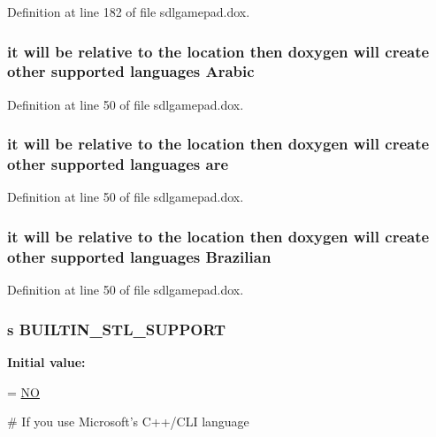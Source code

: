 Definition at line 182 of file sdlgamepad.\-dox.

\hypertarget{sdlgamepad_8dox_a09569d1a0354f8f4cabb5f3633abc16b}{
\subsubsection[{Arabic}]{\setlength{\rightskip}{0pt plus 5cm}it will be relative to the {\bf location} then doxygen will create other supported languages Arabic}}\label{sdlgamepad_8dox_a09569d1a0354f8f4cabb5f3633abc16b}


Definition at line 50 of file sdlgamepad.\-dox.

\hypertarget{sdlgamepad_8dox_a6d0965b20c4eb2235e8f9f5f0e5193ae}{
\subsubsection[{are}]{\setlength{\rightskip}{0pt plus 5cm}it will be relative to the {\bf location} then doxygen will create other supported languages are}}\label{sdlgamepad_8dox_a6d0965b20c4eb2235e8f9f5f0e5193ae}


Definition at line 50 of file sdlgamepad.\-dox.

\hypertarget{sdlgamepad_8dox_a8e7728ba488d59bc2d1023e8f1325f11}{
\subsubsection[{Brazilian}]{\setlength{\rightskip}{0pt plus 5cm}it will be relative to the {\bf location} then doxygen will create other supported languages Brazilian}}\label{sdlgamepad_8dox_a8e7728ba488d59bc2d1023e8f1325f11}


Definition at line 50 of file sdlgamepad.\-dox.

\hypertarget{sdlgamepad_8dox_ab43c02f50185eae26e7fdfe802989f59}{
\subsubsection[{B\-U\-I\-L\-T\-I\-N\-\_\-\-S\-T\-L\-\_\-\-S\-U\-P\-P\-O\-R\-T}]{ {\bf s} B\-U\-I\-L\-T\-I\-N\-\_\-\-S\-T\-L\-\_\-\-S\-U\-P\-P\-O\-R\-T}}\label{sdlgamepad_8dox_ab43c02f50185eae26e7fdfe802989f59}
{\bfseries Initial value\-:}
\begin{DoxyCode}
= \hyperlink{sdlgamepad_8dox_a0f6a46245280dc38baf9600906aa1393}{NO}

\textcolor{preprocessor}{# If you use Microsoft's C++/CLI language}
\end{DoxyCode}


